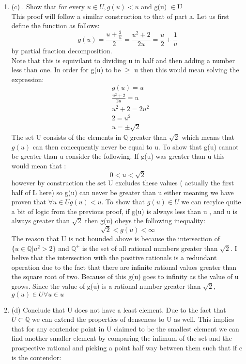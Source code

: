 \documentclass[11pt]{article}
\theoremstyle{definition}  %
\newcommand{\Q}{\mathbb{Q}}
\begin{document}
\begin{enumerate}
  \item (c)
  . Show that for every $u \in  U, g(u) < u$ and g(u) $\in$U\\
  This proof will follow a similar construction to that of part a. Let us first define the function as follows:\\
  \[
    g(u)=\frac{u+\frac{2}{u}}{2}=\frac{u^2+2}{2u}=\frac{u}{2}+\frac{1}{u}
  \]
  by partial fraction decomposition. \\
  Note that this is equivilant to dividing u in half and then adding a number less than one. In order for g(u) to be $\geq $ u then this would mean solving the expression: \[
    g(u)=u
  \]
  \begin{align*}
  &  \frac{u^2+2}{2u}=u\\
  & u^2+2=2u^2\\
  &2=u^2\\
  &u=\pm\sqrt{2}
  \end{align*}
  The set U consists of the elements in $\mathbb{Q}$ greater than $\sqrt{2}$ which means that $g(u)$ can then concequently never be equal to u. To show that g(u) cannot be greater than u consider the following. If g(u) was greater than u this would mean that :
  \[
    0<u<\sqrt{2}
  \]
  however by construction the set U excludes these values ( actually the first half of L here) so g(u) can never be greater than u either meaning we have proven that $\forall u\in U g(u)<u$. To show that $g(u)\in U$ we can recylce quite a bit of logic from the previous proof, if g(u) is always less than u , and u is always greater than $\sqrt{2} $ then g(u) obeys the following inequality:
  \[
    \sqrt{2}<g(u)<\infty
  \]
  The reason that U is not bounded above is because the intersection of $\{u \in \Q|u^2 > 2\}$ and  $\Q^+$ is the set of all rational numbers greater than $\sqrt{2}$. I belive that the intersection with the positive rationals is a redundant operation due to the fact that there are infinite rational values greater than the square root of two. Because of this g(u) goes to infinity as the value of u grows. Since the value of g(u) is a rational number greater than $\sqrt{2}$, $g(u)\in U \forall u \in u $
  \item (d) Conclude that U does not have a least element.
  Due to the fact that $U \subset \Q $ we can extend the properties of denseness to U as well. This implies that for any contendor point in U claimed to be the smallest element we can find another smaller element by comparing the infimum of the set and the prospective rational and picking a point half way between them such that if c is the contendor:

\end{enumerate}
\end{document}

